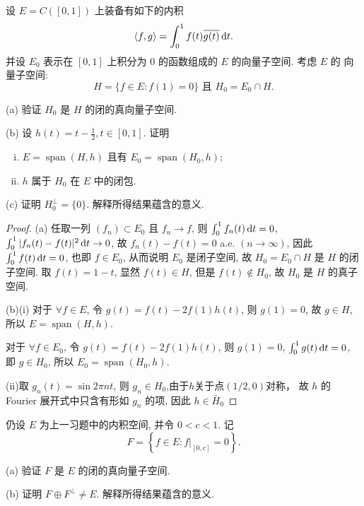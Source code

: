 \begin{exercise}
    设 $E=C([0,1])$ 上装备有如下的内积
    \[
    \langle f,g\rangle=\int_{0}^{1} f(t) \overline{g(t)}\mathop{}\!\mathrm{d} t.
    \]
    并设 $E_{0}$ 表示在 $[0,1]$ 上积分为 $0$ 的函数组成的 $E$ 的向量子空间. 考虑 $E$ 的 向量子空间:
    \[
    H=\{f \in E: f(1)=0\} \text {\ 且\ } H_{0}=E_{0} \cap H.
    \]

    (a) 验证 $H_{0}$ 是 $H$ 的闭的真向量子空间.

    (b) 设 $h(t)=t-\frac{1}{2}, t \in[0,1]$. 证明
    \begin{enumerate}[(i)]
    \item $E=\operatorname{span}(H, h)$ 且有 $E_{0}=\operatorname{span}\left(H_{0}, h\right)$;
    \item $h$ 属于 $H_{0}$ 在 $E$ 中的闭包.
    \end{enumerate}

    (c) 证明 $H_{0}^{\perp}=\{0\}$. 解释所得结果蕴含的意义.
\end{exercise}

\begin{proof}
    (a) 任取一列 $(f_n)\subset E_0$ 且 $f_n\rightarrow f$,
    则 $\int_0^1 f_n(t)\mathop{}\!\mathrm{d} t=0$, $\int_0^1|f_n(t)-f(t)|^2\mathop{}\!\mathrm{d} t\rightarrow0$,
    故 $f_n(t)-f(t)=0$ a.e. $(n\to\infty)$,
    因此 $\int_0^1 f(t)\mathop{}\!\mathrm{d} t=0$, 也即 $f\in E_0$,
    从而说明 $E_0$ 是闭子空间, 故 $H_0=E_0\cap H$ 是 $H$ 的闭子空间.
    取 $f(t)=1-t$, 显然 $f(t)\in H$, 但是 $f(t)\notin H_0$, 故 $H_0$ 是 $H$ 的真子空间.

    (b)(i) 对于 $\forall f\in E$,
    令 $g(t)=f(t)-2f(1)h(t)$,
    则 $g(1)=0$, 故 $g\in H$, 所以 $E=\operatorname{span}(H,h)$.

    对于 $\forall f\in E_0$,
    令 $g(t)=f(t)-2f(1)h(t)$, 则 $g(1)=0$,
    $\int_0^1 g(t)\mathop{}\!\mathrm{d} t=0$, 即 $g\in H_0$, 所以 $E_0=\operatorname{span}(H_0,h)$.

    (ii)取 $g_n(t)=\sin2\pi nt$, 则 $g_n\in H_0$,由于$h$关于点$(1/2,0)$对称，
    故 $h$ 的 Fourier 展开式中只含有形如 $g_n$ 的项, 因此 $h\in\bar{H}_0$
\end{proof}



\begin{exercise}
    仍设 $E$ 为上一习题中的内积空间, 并令 $0<c<1$. 记
\[
F=\left\{f \in E:f|_{[0, c]}=0\right\}.
\]

(a) 验证 $F$ 是 $E$ 的闭的真向量子空间.

(b) 证明 $F \oplus F^{\perp} \neq E$. 解释所得结果蕴含的意义.
\end{exercise}

